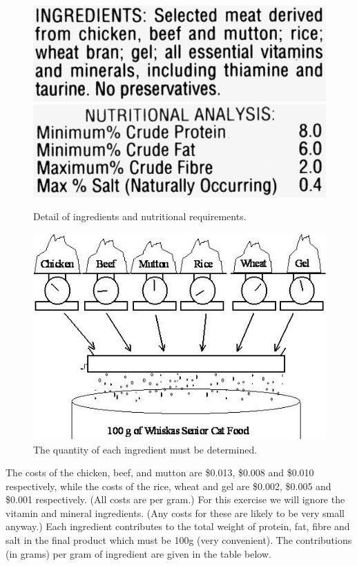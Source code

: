 \documentclass[a4paper,oneside]{arlimsTPPM}
\begin{document}
\begin{figure}[h]
 \centering
\includegraphics[scale=0.5]{images/whiskas_ingredients.jpg}\includegraphics[scale=0.5]{images/whiskas_nutrition.jpg}
\caption{Detail of ingredients and nutritional requirements.}
\end{figure}

\begin{figure}[h]
 \centering
\includegraphics[scale=0.6]{images/whiskas_blend.jpg} 
\caption{The quantity of each ingredient must be determined.}
\end{figure}
The costs of the chicken, beef, and mutton are \$0.013, \$0.008 and \$0.010 respectively, while the costs of the rice, wheat and gel are \$0.002, \$0.005 and \$0.001 respectively. (All costs are per gram.) For this exercise we will ignore the vitamin and mineral ingredients. (Any costs for these are likely to be very small anyway.) 
Each ingredient contributes to the total weight of protein, fat, fibre and salt in the final product which must be 100g (very convenient). The contributions (in grams) per gram of ingredient are given in the table below. 
\end{document}
